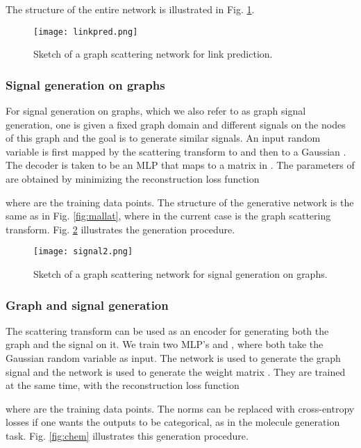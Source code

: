 \documentclass[conference]{IEEEtran}
\begin{document}
The structure of the entire network is illustrated in Fig. \ref{fig:linkpred}.

\begin{figure}[t]
    \centering
    \texttt{[image: linkpred.png]}
    \caption{Sketch of a graph scattering network for link prediction.} 
    \label{fig:linkpred}
\end{figure}


\subsubsection{Signal generation on graphs}\label{subsec:theographsignalgen}
For signal generation on graphs, which we also refer to as graph signal generation, one is given a fixed graph domain and different signals on the nodes of this graph and the goal is to generate similar signals. An input random variable  is first mapped by the scattering transform to  and then to a Gaussian . The decoder  is taken to be an MLP that maps  to a matrix  in . The parameters of  are obtained by minimizing the reconstruction loss function 

where  are the training data points.
The structure of the generative network is the same as in Fig. \ref{fig:mallat}, where in the current case  is the graph scattering transform.
Fig. \ref{fig:signal} illustrates the generation procedure.

\begin{figure}[t]
    \centering
    \texttt{[image: signal2.png]}
    \caption{Sketch of a graph scattering network for signal generation on graphs.} \label{fig:signal}
\end{figure}

\subsubsection{Graph and signal generation}\label{subsec:theographandsignalgen}
The scattering transform can be used as an encoder for generating both the graph and the signal on it. We train two MLP's  and , where both take the Gaussian random variable  as input. The network  is used to generate the graph signal  and the network  is used to generate the weight matrix . They are trained at the same time, with the reconstruction loss function 

where  are the training data points. The norms can be replaced with cross-entropy losses if one wants the outputs to be categorical, {as in the molecule generation task}.
Fig. \ref{fig:chem} illustrates this generation procedure. 
\end{document}
